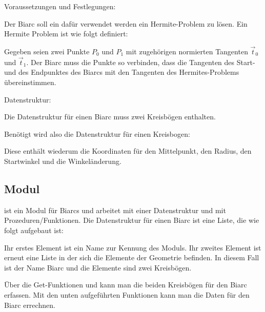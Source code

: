 Voraussetzungen und Festlegungen:

Der Biarc soll ein dafür verwendet werden ein Hermite-Problem zu lösen. Ein Hermite Problem ist wie folgt definiert:

Gegeben seien zwei Punkte $P_0$ und $P_1$ mit zugehörigen normierten Tangenten $\vec{t}_0$ und $\vec{t}_1$. Der Biarc muss die Punkte so verbinden, dass die Tangenten des Start- und des Endpunktes des Biarcs mit den Tangenten des Hermites-Problems übereinstimmen.


Datenstruktur:

Die Datenstruktur  für einen Biarc muss zwei Kreisbögen enthalten.

Benötigt wird also die Datenstruktur für einen Kreisbogen: 

Diese enthält wiederum die Koordinaten für den Mittelpunkt, den Radius, den Startwinkel und die Winkeländerung.

\subsection{Modul }

 ist ein Modul für Biarcs und arbeitet mit einer Datenstruktur und mit Prozeduren/Funktionen. Die Datenstruktur  für einen Biarc ist eine Liste, die wie folgt aufgebaut ist:

\medskip


\medskip

Ihr erstes Element ist ein Name zur Kennung des Moduls. Ihr zweites Element ist erneut eine Liste in der sich die Elemente der Geometrie befinden. In diesem Fall ist der Name \glqq Biarc\grqq{} und die Elemente sind zwei Kreisbögen.

Über die Get-Funktionen  und   kann man die beiden Kreisbögen für den Biarc erfassen. Mit den unten aufgeführten Funktionen kann man die Daten für den Biarc errechnen. 

